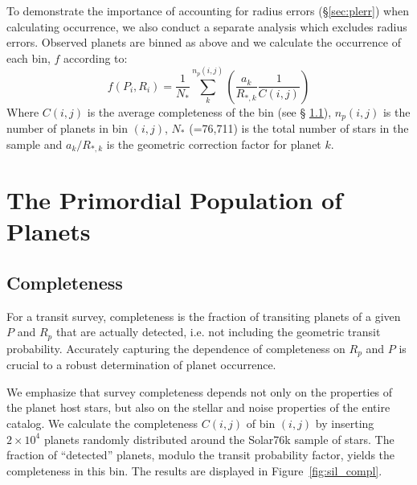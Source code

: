 To demonstrate the importance of accounting for radius errors 
(\S\ref{sec:plerr}) when calculating occurrence, we also conduct 
a separate analysis which excludes radius errors. Observed planets are 
binned as above and we calculate the occurrence of each bin, $f$ according to:
\begin{equation}
f(P_i,R_i) = \frac{1}{N_*}\sum\limits_{k}^{n_p(i,j)}\left(\frac{a_k}{R_{*,k}}\frac{1}{C(i,j)}\right)
\label{eq:occtw}
\end{equation}
Where $C(i,j)$ is the average completeness of the bin (see \S
\ref{sec:completeness}), $n_p(i,j)$ is the number of planets in bin $(i,j)$, 
$N_*$ (=76,711) is the total number of stars in the sample and $a_k/R_{*,k}$ is 
the geometric correction factor for planet $k$. 

\section{The Primordial Population of \kep{} Planets}

\subsection{Completeness}
\label{sec:completeness}

For a transit survey, completeness is the fraction of transiting
planets of a given $P$ and $R_p$ that are actually
detected, i.e. not including the geometric transit probability. 
Accurately capturing the dependence of completeness
on $R_p$ and $P$ is crucial to a robust determination of planet
occurrence.

We emphasize that survey completeness depends not only on
the properties of the planet host stars, but also on the stellar
and noise properties of the entire catalog.  We calculate
the completeness $C(i,j)$ of bin $(i,j)$ by inserting $2\times
10^4$ planets randomly distributed around the Solar76k
sample of stars. The fraction of ``detected'' planets, modulo the
transit probability factor, yields the completeness in this bin.
The results are displayed in Figure~\ref{fig:sil_compl}.

